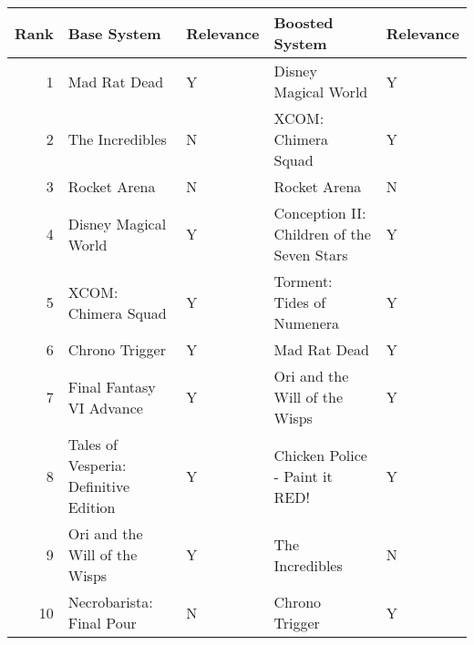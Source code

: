\begin{tabular}{rllll}
\toprule
Rank & Base System & Relevance & Boosted System & Relevance \\
\midrule
1 & Mad Rat Dead & Y & Disney Magical World & Y \\
2 & The Incredibles & N & XCOM: Chimera Squad & Y \\
3 & Rocket Arena & N & Rocket Arena & N \\
4 & Disney Magical World & Y & Conception II: Children of the Seven Stars & Y \\
5 & XCOM: Chimera Squad & Y & Torment: Tides of Numenera & Y \\
6 & Chrono Trigger & Y & Mad Rat Dead & Y \\
7 & Final Fantasy VI Advance & Y & Ori and the Will of the Wisps & Y \\
8 & Tales of Vesperia: Definitive Edition & Y & Chicken Police - Paint it RED! & Y \\
9 & Ori and the Will of the Wisps & Y & The Incredibles & N \\
10 & Necrobarista: Final Pour & N & Chrono Trigger & Y \\
\bottomrule
\end{tabular}
